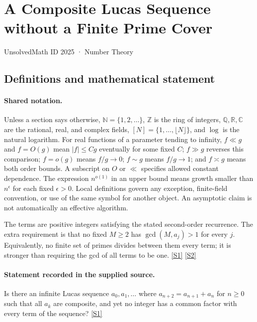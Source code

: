 \documentclass[11pt,a4paper]{article}
\newcommand{\N}{\mathbb{N}}
\newcommand{\Z}{\mathbb{Z}}
\newcommand{\Q}{\mathbb{Q}}
\newcommand{\R}{\mathbb{R}}
\newcommand{\C}{\mathbb{C}}
\newcommand{\sref}[2]{\hyperlink{source:#1:#2}{[S#2]}}
\begin{document}

\setcounter{section}{2024}

\section{A Composite Lucas Sequence without a Finite Prime Cover}\label{2025}

{\small\sffamily UnsolvedMath ID 2025 · Number Theory}

\subsection{Definitions and mathematical statement}

\paragraph{Shared notation.}Unless a section says otherwise, $\N=\{1,2,\ldots\}$,
$\Z$ is the ring of integers, $\Q,\R,\C$ are the rational, real, and complex
fields, $[N]=\{1,\ldots,\lfloor N\rfloor\}$, and $\log$ is the natural
logarithm. For real functions of a parameter tending to infinity,
$f\ll g$ and $f=O(g)$ mean $|f|\leq Cg$ eventually for some fixed $C$;
$f\gg g$ reverses this comparison; $f=o(g)$ means $f/g\to0$;
$f\sim g$ means $f/g\to1$; and $f\asymp g$ means both order bounds.
A subscript on $O$ or $\ll$ specifies allowed constant dependence.
The expression $n^{o(1)}$ in an upper bound means growth smaller than
$n^\epsilon$ for each fixed $\epsilon>0$. Local definitions govern any
exception, finite-field convention, or use of the same symbol for another
object. An asymptotic claim is not automatically an effective algorithm.



The terms are positive integers satisfying the stated second-order recurrence. The extra requirement is that no fixed $M\geq2$ has $\gcd(M,a_j)>1$ for every $j$. Equivalently, no finite set of primes divides between them every term; it is stronger than requiring the gcd of all terms to be one. \sref{2025}{1} \sref{2025}{2}

\paragraph{Statement recorded in the supplied source.}
Is there an infinite Lucas sequence $a_0,a_1,\ldots$ where $a_{n+2}=a_{n+1}+a_n$ for $n\geq 0$ such that all $a_k$ are composite, and yet no integer has a common factor with every term of the sequence? \sref{2025}{1}
\end{document}
